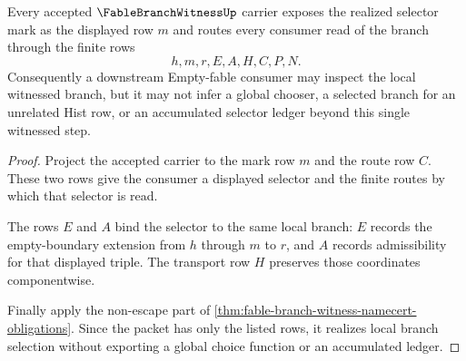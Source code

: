 \begin{theorem}
\label{thm:fable-branch-witness-selector-exposure}
Every accepted $\FableBranchWitnessUp$ carrier exposes the realized selector mark as the displayed row $m$ and routes every consumer read of the branch through the finite rows
$$
h,m,r,E,A,H,C,P,N.
$$
Consequently a downstream Empty-fable consumer may inspect the local witnessed branch, but it may not infer a global chooser, a selected branch for an unrelated Hist row, or an accumulated selector ledger beyond this single witnessed step.
\end{theorem}
\begin{proof}
Project the accepted carrier to the mark row $m$ and the route row $C$. These two rows give the consumer a displayed selector and the finite routes by which that selector is read.

The rows $E$ and $A$ bind the selector to the same local branch: $E$ records the empty-boundary extension from $h$ through $m$ to $r$, and $A$ records admissibility for that displayed triple. The transport row $H$ preserves those coordinates componentwise.

Finally apply the non-escape part of \autoref{thm:fable-branch-witness-namecert-obligations}. Since the packet has only the listed rows, it realizes local branch selection without exporting a global choice function or an accumulated ledger.
\end{proof}

